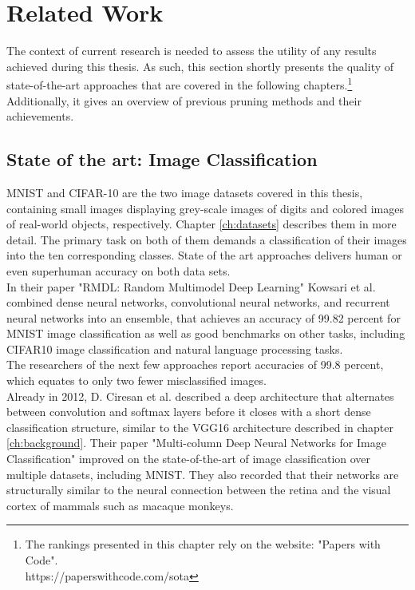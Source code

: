 \chapter{Related Work}
\label{ch:relatedwork}
 The context of current research is needed to assess the utility of any results achieved during this thesis. As such, this section shortly presents the quality of state-of-the-art approaches that are covered in the following chapters.\footnote{The rankings presented in this chapter rely on the website: "Papers with Code".\\
 	https://paperswithcode.com/sota
 } Additionally, it gives an overview of previous pruning methods and their achievements. 

\section{State of the art: Image Classification}
MNIST and CIFAR-10 are the two image datasets covered in this thesis, containing small images displaying grey-scale images of digits and colored images of real-world objects, respectively. Chapter \ref{ch:datasets} describes them in more detail.
The primary task on both of them demands a classification of their images into the ten corresponding classes. State of the art approaches delivers human or even superhuman accuracy on both data sets.\\
In their paper "RMDL: Random Multimodel Deep Learning" Kowsari et al. combined dense neural networks, convolutional neural networks, and recurrent neural networks into an ensemble, that achieves an accuracy of 99.82 percent for MNIST image classification as well as good benchmarks on other tasks, including CIFAR10 image classification and natural language processing tasks.\cite{RMDL}\\
The researchers of the next few approaches report accuracies of 99.8 percent, which equates to only two fewer misclassified images.\\
Already in 2012, D. Ciresan et al. described a deep architecture that alternates between convolution and softmax layers before it closes with a short dense classification structure, similar to the VGG16 architecture described in chapter \ref{ch:background}. Their paper "Multi-column Deep Neural Networks for Image Classification" improved on the state-of-the-art of image classification over multiple datasets, including MNIST. They also recorded that their networks are structurally similar to the neural connection between the retina and the visual cortex of mammals such as macaque monkeys.\cite{Multi-Column}\\
